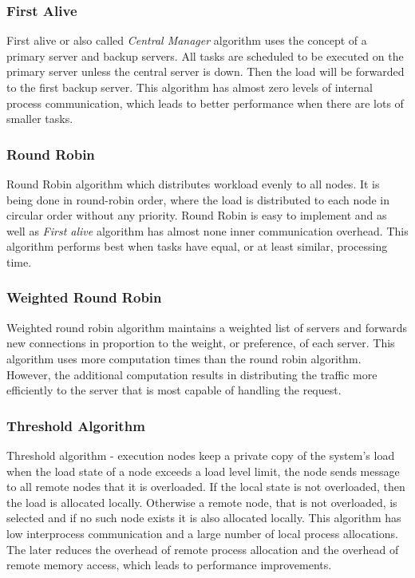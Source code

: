 \subsubsection{First Alive}
First alive or also called \textit{Central Manager} algorithm uses the concept of a primary server and backup servers\cite{web:ibmLoadBalancingDecisions}.
All tasks are scheduled to be executed on the primary server unless the central server is down.
Then the load will be forwarded to the first backup server.
This algorithm has almost zero levels of internal process communication, which leads to better performance when there are lots of smaller tasks.

\subsubsection{Round Robin}
Round Robin algorithm which distributes workload evenly to all nodes.
It is being done in round-robin order, where the load is distributed to each node in circular order without any priority.
Round Robin is easy to implement and as well as \textit{First alive} algorithm has almost none inner communication overhead.
This algorithm performs best when tasks have equal, or at least similar, processing time.

\subsubsection{Weighted Round Robin}
Weighted round robin algorithm maintains a weighted list of servers and forwards new connections in proportion to the weight, or preference,
of each server.
This algorithm uses more computation times than the round robin algorithm.
However, the additional computation results in distributing the traffic more efficiently to the server that is most capable of handling the request\cite{web:ibmLoadBalancingDecisions}.

\subsubsection{Threshold Algorithm}
Threshold algorithm - execution nodes keep a private copy of the system's load when the load state of a node exceeds a load level limit,
the node sends message to all remote nodes that it is overloaded.
If the local state is not overloaded, then the load is allocated locally.
Otherwise a remote node, that is not overloaded, is selected and if no such node exists it is also allocated locally.
This algorithm has low interprocess communication and a large number of local process allocations.
The later reduces the overhead of remote process allocation and the overhead of remote memory access,
which leads to performance improvements\cite{web:staticAndDynamicLoadBalancing}.


